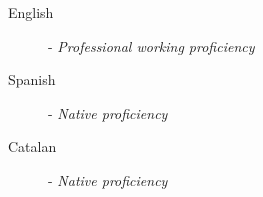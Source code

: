 \begin{description}

    \item[English] - \emph{Professional working proficiency} \hfill %
    
    \item[Spanish] - \emph{Native proficiency}
    
    \item[Catalan] - \emph{Native proficiency}

\end{description}